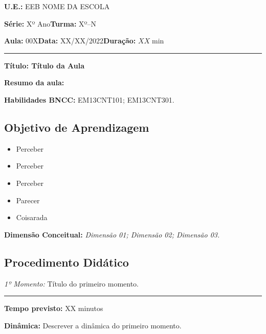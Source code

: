         \noindent \textbf{U.E.: }EEB NOME DA ESCOLA
        
        \noindent \textbf{Série: }Xº Ano\hfill{}\textbf{Turma: }Xº--N
        
        \noindent \textbf{Aula:} 00X\hfill{}\textbf{Data:} XX/XX/2022\hfill{}\textbf{Duração:} $XX\min$
        \rule{\textwidth}{.5pt}
        \bigskip{}  
        
        \noindent \begin{center}
        \textbf{Título: Título da Aula}
        \par\end{center}

        \noindent \textbf{Resumo da aula: }

        \par\noindent \textbf{Habilidades BNCC: }EM13CNT101; EM13CNT301.
        \vfill
        \subsection*{Objetivo de Aprendizagem}
        \begin{itemize}
            \item Perceber
            \item Perceber
            \item Perceber
            \item Parecer
            \item Coisarada 
        \end{itemize}
        
        \medskip{}
        \vfill
        \noindent \textbf{Dimensão Conceitual:} \emph{Dimensão 01; Dimensão 02; Dimensão 03.}
        
        
        \subsection*{Procedimento Didático} 
        \noindent \emph{1º Momento:} Título do primeiro momento.
        \par\noindent\rule{.3\textwidth}{.5pt}  
        \par\noindent \textbf{Tempo previsto:} XX minutos

        \noindent \textbf{Dinâmica:} Descrever a dinâmica do primeiro momento.

